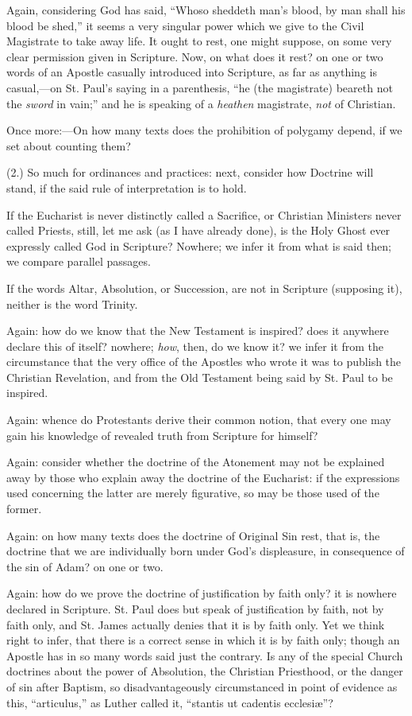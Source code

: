 Again, considering God has said, ``Whoso sheddeth man's blood,
by man shall his blood be shed,'' it seems a very singular power
which we give to the Civil Magistrate to take away life. It ought to
rest, one might suppose, on some very clear permission given in
Scripture. Now, on what does it rest? on one or two words of an
Apostle casually introduced into Scripture, as far as anything is
casual,—on St. Paul's saying in a parenthesis, ``he (the
magistrate) beareth not the \emph{sword} in vain;'' and he is
speaking of a \emph{heathen} magistrate, \emph{not} of Christian.

Once more:—On how many texts does the prohibition of polygamy
depend, if we set about counting them?

(2.) So much for ordinances and practices: next, consider how
Doctrine will stand, if the said rule of interpretation is to hold.

If the Eucharist is never distinctly called a Sacrifice, or
Christian Ministers never called Priests, still, let me ask (as I have
already done), is the Holy Ghost ever expressly called God in
Scripture? Nowhere; we infer it from what is said then; we compare
parallel passages.

If the words Altar, Absolution, or Succession, are not in Scripture
(supposing it), neither is the word Trinity.

Again: how do we know that the New Testament is inspired? does it
anywhere declare this of itself? nowhere; \emph{how}, then, do we know it? we
infer it from the circumstance that the very office of the Apostles
who wrote it was to publish the Christian Revelation, and from the Old
Testament being said by St. Paul to be inspired.

Again: whence do Protestants derive their common notion, that every
one may gain his knowledge of revealed truth from Scripture for
himself?

Again: consider whether the doctrine of the Atonement may not be
explained away by those who explain away the doctrine of the
Eucharist: if the expressions used concerning the latter are merely
figurative, so may be those used of the former.

Again: on how many texts does the doctrine of Original Sin rest,
that is, the doctrine that we are individually born under God's
displeasure, in consequence of the sin of Adam? on one or two.

Again: how do we prove the doctrine of justification by faith only?
it is nowhere declared in Scripture. St. Paul does but speak of
justification by faith, not by faith only, and St. James actually
denies that it is by faith only. Yet we think right to infer, that
there is a correct sense in which it is by faith only; though an
Apostle has in so many words said just the contrary. Is any of the
special Church doctrines about the power of Absolution, the Christian
Priesthood, or the danger of sin after Baptism, so disadvantageously
circumstanced in point of evidence as this, ``articulus,'' as
Luther called it, ``stantis ut cadentis ecclesiæ''?

